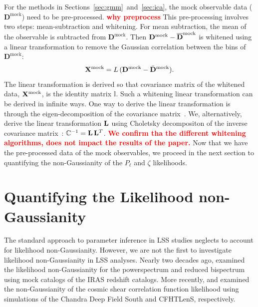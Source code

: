 \documentclass[12pt, letterpaper, preprint]{aastex}
\newcommand{\beq}{\begin{equation}}
\newcommand{\eeq}{\end{equation}}
\newcommand{\todo}[1]{{\bf \textcolor{red}{#1}}}
\newcommand{\Dmock}{\mathbf{D}^\mathrm{mock}}
\newcommand{\Xmock}{{\bf X}^\mathrm{mock}}
\begin{document}
For the methods in Sections~\ref{sec:gmm}~and~\ref{sec:ica}, the mock 
observable data ($\Dmock$) need to be pre-processed. \todo{why preprocess}
This pre-processing
involves two steps: mean-subtraction and whitening. For mean subtraction, 
the mean of the observable is subtracted from $\Dmock$. Then 
$\Dmock - \overline{\bf D}^\mathrm{mock}$ is whitened using a linear transformation 
to remove the Gaussian correlation between the bins of $\Dmock$: 
\beq
\Xmock = L\,(\Dmock - \bar{\bf D}^\mathrm{mock}). 
\eeq
The linear transformation is derived so that covariance matrix of the whitened 
data, $\Xmock$, is the identity matrix $\mathbb{I}$. Such a whitening linear 
transformation can be derived in infinite ways. 
One way to derive the linear transformation is through the eigen-decomposition
of the covariance matrix~\citep[\emph{e.g.}][]{hartlap2009, sellentin2017}. We, alternatively, 
derive the linear transformation ${\bf L}$ using Choletsky decompositon of the 
inverse covariance matrix~\citep{Press:1992:NRC:148286}: 
$\mathbb{C}^{-1} = {\bf L}\,{\bf L}^T$. \todo{We confirm tha the different 
whitening algorithms, does not impact the results of the paper.}
Now that we have the pre-processed data of the mock observables, 
we proceed in the next section to quantifying the non-Gaussianity of the 
$P_\ell$ and $\zeta$ likelihoods. 


\section{Quantifying the Likelihood non-Gaussianity} \label{sec:div}
The standard approach to parameter inference in LSS studies neglects
to account for likelihood non-Gaussianity. 
However, we are not the first to investigate likelihood non-Gaussianity 
in LSS analyses. Nearly two decades ago, \cite{scoccimarro2000} examined 
the likelihood non-Gaussianity for the powerspectrum and reduced bispectrum 
using mock catalogs of the IRAS redshift catalogs. More recently, 
\cite{hartlap2009} and \cite{sellentin2017} examined the non-Gaussianity 
of the cosmic shear correlation function likelihood using simulations of 
the Chandra Deep Field South and CFHTLenS, respectively. 
\end{document}
